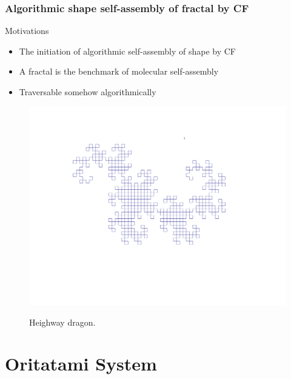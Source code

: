\documentclass[dvipdfmx,10pt]{beamer}
\begin{document}
\begin{frame}\frametitle{Algorithmic shape self-assembly of fractal by CF}
\begin{block}{Motivations}
\begin{itemize}
\item The initiation of algorithmic self-assembly of shape by CF
\item A fractal is the benchmark of molecular self-assembly
\item Traversable somehow algorithmically
\end{itemize}
\end{block}
\begin{figure}
\centering
\href{run:Dragon.mp4}{
  \includegraphics[width=0.6\linewidth]{heighway_ori.pdf} 
}
\caption{Heighway dragon.}
\end{figure}
\end{frame}


\section{Oritatami System}
\end{document}
